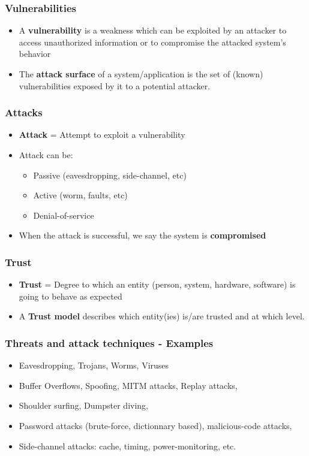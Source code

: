 \documentclass[
hyperref={pdfpagelabels=false}
,xcolor=table
]
{beamer}
\begin{document}
\begin{frame}
  \frametitle{Vulnerabilities}
  \begin{itemize}
  \item A \textbf{vulnerability} is a weakness which can be exploited by an
    attacker to access unauthorized information or to compromise the
    attacked system's behavior
  \item The \textbf{attack surface} of a system/application is the set of
    (known) vulnerabilities exposed by it to a potential attacker.
  \end{itemize}
\end{frame}


\begin{frame}
  \frametitle{Attacks}
  \begin{itemize}
  \item \textbf{Attack} = Attempt to exploit a vulnerability
  \item Attack can be:
    \begin{itemize}
    \item Passive (eavesdropping, side-channel, etc)
    \item Active (worm, faults, etc)
    \item Denial-of-service
    \end{itemize}
  \item When the attack is successful, we say the system is \textbf{compromised} 
  \end{itemize}
\end{frame}


\begin{frame}
  \frametitle{Trust}
  \begin{itemize}
  \item \textbf{Trust} = Degree to which an entity (person, system, hardware, software) is going to behave as expected
  \item A \textbf{Trust model} describes which entity(ies) is/are
    trusted and at which level.
  \end{itemize}
\end{frame}

\begin{frame}
  \frametitle{Threats and attack techniques - Examples}

  \begin{itemize}
  \item Eavesdropping, Trojans, Worms, Viruses
  \item Buffer Overflows, Spoofing, MITM attacks, Replay attacks, 
  \item Shoulder surfing, Dumpster diving, 
  \item Password attacks (brute-force, dictionnary based), malicious-code attacks, 
  \item Side-channel attacks: cache, timing, power-monitoring, etc.
  \end{itemize}
\end{frame}
\end{document}
